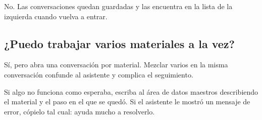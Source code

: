 No. Las conversaciones quedan guardadas y las encuentra en la lista de la
izquierda cuando vuelva a entrar.

\subsection*{¿Puedo trabajar varios materiales a la vez?}

Sí, pero abra una conversación por material. Mezclar varios en la misma
conversación confunde al asistente y complica el seguimiento.

\begin{nota}
Si algo no funciona como esperaba, escriba al área de datos maestros
describiendo el material y el paso en el que se quedó. Si el asistente le
mostró un mensaje de error, cópielo tal cual: ayuda mucho a resolverlo.
\end{nota}


